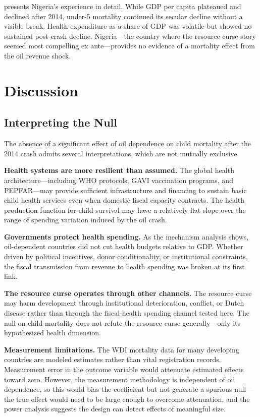 \documentclass[12pt]{article}
\begin{document}
 presents Nigeria's experience in detail. While GDP per capita plateaued and declined after 2014, under-5 mortality continued its secular decline without a visible break. Health expenditure as a share of GDP was volatile but showed no sustained post-crash decline. Nigeria---the country where the resource curse story seemed most compelling ex ante---provides no evidence of a mortality effect from the oil revenue shock.


\section{Discussion}
\label{sec:discussion}

\subsection{Interpreting the Null}

The absence of a significant effect of oil dependence on child mortality after the 2014 crash admits several interpretations, which are not mutually exclusive.

\textbf{Health systems are more resilient than assumed.} The global health architecture---including WHO protocols, GAVI vaccination programs, and PEPFAR---may provide sufficient infrastructure and financing to sustain basic child health services even when domestic fiscal capacity contracts. The health production function for child survival may have a relatively flat slope over the range of spending variation induced by the oil crash.

\textbf{Governments protect health spending.} As the mechanism analysis shows, oil-dependent countries did not cut health budgets relative to GDP. Whether driven by political incentives, donor conditionality, or institutional constraints, the fiscal transmission from revenue to health spending was broken at its first link.

\textbf{The resource curse operates through other channels.} The resource curse may harm development through institutional deterioration, conflict, or Dutch disease rather than through the fiscal-health spending channel tested here. The null on child mortality does not refute the resource curse generally---only its hypothesized health dimension.

\textbf{Measurement limitations.} The WDI mortality data for many developing countries are modeled estimates rather than vital registration records. Measurement error in the outcome variable would attenuate estimated effects toward zero. However, the measurement methodology is independent of oil dependence, so this would bias the coefficient but not generate a spurious null---the true effect would need to be large enough to overcome attenuation, and the power analysis suggests the design can detect effects of meaningful size.
\end{document}
